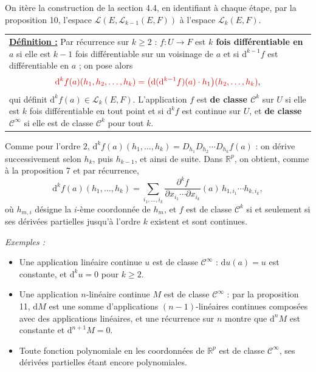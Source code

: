 \documentclass[a4paper,twoside]{report}
\newcommand{\mot}[1]{\textcolor{rougecours}{\textbf{#1}}}
\newcommand{\rmath}[1]{\textcolor{rougecours}{#1}}
\newenvironment{exemples}%
 {\par\needspace{6\baselineskip}\vspace{1mm}\begin{list}{}{\leftmargin=1cm \rightmargin=0.5cm}\item[]%
  \textit{Exemples :}%
  \begin{itemize}[label=$\bullet$,leftmargin=0.45cm,topsep=3pt,itemsep=4pt]}%
 {\end{itemize}\end{list}\vspace{1mm}}
\newcommand{\R}{\mathbb{R}}
\newcommand{\dd}{\mathrm{d}}                      %
\newcommand{\Cc}{\mathcal{C}}                     %
\newcommand{\Lc}{\mathcal{L}}                     %
\begin{document}
On itère la construction de la section 4.4, en identifiant à chaque étape, par la proposition 10, l'espace $\Lc(E, \Lc_{k - 1}(E, F))$ à l'espace $\Lc_{k}(E, F)$.

\begin{center}
\begin{tabularx}{15cm}{||X}
\noindent \textbf{\underline{Définition :}} Par récurrence sur $k \geqslant 2$ : $f : U \to F$ est \mot{$k$ fois différentiable en $a$} si elle est $k - 1$ fois différentiable sur un voisinage de $a$ et si $\dd^{k - 1} f$ est différentiable en $a$ ; on pose alors
\[ \rmath{\dd^{k} f(a)(h_{1}, h_{2}, \dots, h_{k}) = \big(\dd(\dd^{k - 1} f)(a)\cdot h_{1}\big)(h_{2}, \dots, h_{k})}, \]
qui définit $\dd^{k} f(a) \in \Lc_{k}(E, F)$. L'application $f$ est \mot{de classe $\Cc^{k}$} sur $U$ si elle est $k$ fois différentiable en tout point et si $\dd^{k} f$ est continue sur $U$, et \mot{de classe $\Cc^{\infty}$} si elle est de classe $\Cc^{k}$ pour tout $k$.
\end{tabularx}
\end{center}

\noindent Comme pour l'ordre $2$, $\dd^{k} f(a)(h_{1}, \dots, h_{k}) = D_{h_{1}}D_{h_{2}}\cdots D_{h_{k}} f(a)$ : on dérive successivement selon $h_{k}$, puis $h_{k - 1}$, et ainsi de suite. Dans $\R^{p}$, on obtient, comme à la proposition 7 et par récurrence,
\[ \dd^{k} f(a)(h_{1}, \dots, h_{k}) = \sum_{i_{1}, \dots, i_{k}} \frac{\partial^{k} f}{\partial x_{i_{1}}\cdots\partial x_{i_{k}}}(a)\,h_{1, i_{1}}\cdots h_{k, i_{k}}, \]
où $h_{m, i}$ désigne la $i$-ème coordonnée de $h_{m}$, et $f$ est de classe $\Cc^{k}$ si et seulement si ses dérivées partielles jusqu'à l'ordre $k$ existent et sont continues.

\begin{exemples}
  \item Une application linéaire continue $u$ est de classe $\Cc^{\infty}$ : $\dd u(a) = u$ est constante, et $\dd^{k} u = 0$ pour $k \geqslant 2$.
  \item Une application $n$-linéaire continue $M$ est de classe $\Cc^{\infty}$ : par la proposition 11, $\dd M$ est une somme d'applications $(n - 1)$-linéaires continues composées avec des applications linéaires, et une récurrence sur $n$ montre que $\dd^{n} M$ est constante et $\dd^{n + 1} M = 0$.
  \item Toute fonction polynomiale en les coordonnées de $\R^{p}$ est de classe $\Cc^{\infty}$, ses dérivées partielles étant encore polynomiales.
\end{exemples}
\end{document}

